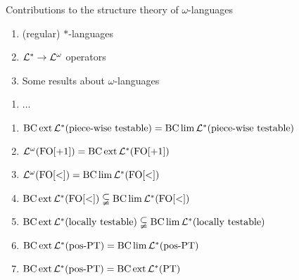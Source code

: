 \documentclass[a4,notes]{seminar}
\begin{document}
\begin{slide}
\center\huge Contributions to the structure theory of $ω$-languages
\end{slide}

\begin{slide}
\begin{enumerate}
\item (regular) $*$-languages
\item $\Lang^* \rightarrow \Lang^\omega$ operators
\item Some results about $\omega$-languages
\end{enumerate}
\end{slide}

\begin{slide}
\begin{enumerate}
\item ...
\end{enumerate}
\end{slide}

\begin{slide}
\begin{enumerate}
\item $ \BC \ext \Lang^* (\PT) = \BC \lim \Lang^* (\PT) $
\item $ \Lang^\omega (\mathrm{FO[+1]}) = \BC \ext \Lang^*(\mathrm{FO[+1]}) $
\item $ \Lang^\omega (\mathrm{FO[<]}) = \BC \lim \Lang^*(\mathrm{FO[<]}) $
\item $ \BC \ext \Lang^*( \mathrm{FO[<]} ) \subsetneqq \BC \lim \Lang^* ( \mathrm{FO[<]} )  $
\item $ \BC \ext \Lang^* (\LT) \subsetneqq \BC \lim \Lang^*(\LT) $
\item $ \BC \ext \Lang^* (\mathtext{pos-PT}) = \BC \lim \Lang^* (\mathtext{pos-PT}) $
\item $ \BC \ext \Lang^*(\mathtext{pos-PT}) = \BC \ext \Lang^* (\mathtext{PT}) $
\end{enumerate}
\end{slide}
\end{document}
